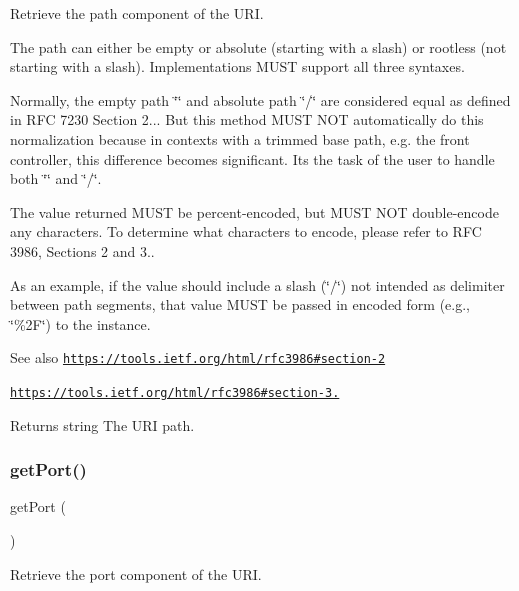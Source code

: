 Retrieve the path component of the U\+RI.

The path can either be empty or absolute (starting with a slash) or rootless (not starting with a slash). Implementations M\+U\+ST support all three syntaxes.

Normally, the empty path \char`\"{}\char`\"{} and absolute path \char`\"{}/\char`\"{} are considered equal as defined in R\+FC 7230 Section 2... But this method M\+U\+ST N\+OT automatically do this normalization because in contexts with a trimmed base path, e.\+g. the front controller, this difference becomes significant. It\textquotesingle{}s the task of the user to handle both \char`\"{}\char`\"{} and \char`\"{}/\char`\"{}.

The value returned M\+U\+ST be percent-\/encoded, but M\+U\+ST N\+OT double-\/encode any characters. To determine what characters to encode, please refer to R\+FC 3986, Sections 2 and 3..

As an example, if the value should include a slash (\char`\"{}/\char`\"{}) not intended as delimiter between path segments, that value M\+U\+ST be passed in encoded form (e.\+g., \char`\"{}\%2\+F\char`\"{}) to the instance.

\begin{DoxySeeAlso}{See also}
\href{https://tools.ietf.org/html/rfc3986#section-2}{\tt https\+://tools.\+ietf.\+org/html/rfc3986\#section-\/2} 

\href{https://tools.ietf.org/html/rfc3986#section-3.3}{\tt https\+://tools.\+ietf.\+org/html/rfc3986\#section-\/3.} 
\end{DoxySeeAlso}
\begin{DoxyReturn}{Returns}
string The U\+RI path. 
\end{DoxyReturn}
\mbox{\label{class_pes_1_1_http_1_1_uri_afd4db46d3c12f47f0bee19cd2101be64}} 
\subsubsection{\texorpdfstring{get\+Port()}{getPort()}}
{\footnotesize\ttfamily get\+Port (\begin{DoxyParamCaption}{ }\end{DoxyParamCaption})}

Retrieve the port component of the U\+RI.

